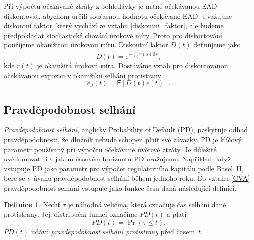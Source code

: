\documentclass[a4paper,12pt]{report}
\theoremstyle{definition} \newtheorem{definice}[veta]{Definice}
\theoremstyle{remark}
\begin{document}
Při výpočtu očekávané ztráty z pohledávky je nutné očekávanou EAD diskontovat, abychom určili současnou hodnotu očekávané EAD. 
Uvažujme diskontní faktor, který vychází ze vztahu \eqref{diskontni_faktor}, ale budeme předpokládat stochastické chování úrokové míry.
Proto pro diskontování použijeme okamžitou úrokovou míru.
Diskontní faktor $D(t)$ definujeme jako
\begin{equation}\label{diskont_vztah}
D(t)=\mathrm{e}^{-\int_0^t r(s)\,\mathrm{d} s},
\end{equation}
kde $r(t)$ je okamžitá úroková míra. 
Dostáváme vztah pro diskontovanou očekávanou expozici v okamžiku selhání protistrany
\begin{equation}\label{dis_exposure_vztah}
\hat{e}_d(t)=\mathsf{E}[D(t) e(t)].
\end{equation}

\subsection{Pravděpodobnost selhání}
\textit{Pravděpodobnost selhání}, anglicky Probability of Default (PD), poskytuje odhad pravděpodobnosti, že dlužník nebude schopen plnit své závazky.
PD je klíčový parametr používaný při výpočtu očekávané úvěrové ztráty.
Je důležité uvědomovat si v jakém časovém horizontu PD uvažujeme.
Například, když vstupuje PD jako parametr pro výpočet regulatorního kapitálu podle Basel~II, bere se v úvahu pravděpodobnost selhání během jednoho roku.
Do vztahu \eqref{CVA} pravděpodobnost selhání vstupuje jako funkce času daná následující definicí. %
\begin{definice}\label{pd_def}
Nechť $\tau$ je náhodná veličina, která označuje čas selhání dané protistrany.
Její distribuční funkci označíme $PD(t)$ a platí
\begin{equation}
PD(t)=\Pr(\tau\leq t).
\end{equation}
$PD(t)$ udává \textit{pravděpodobnost selhání protistrany} před časem~$t$.
\end{definice}
\end{document}
